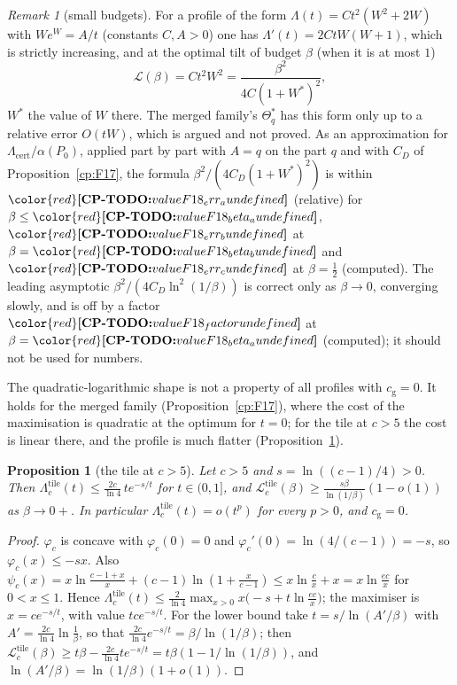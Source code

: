 \documentclass[11pt]{article}
\makeatletter
\newtheorem{proposition}[theorem]{Proposition}
\theoremstyle{definition}
\theoremstyle{remark}
\newtheorem{remark}[theorem]{Remark}
\DeclareRobustCommand{\CPTODO}[1]{{\color{red}\textbf{[CP-TODO:} #1\textbf{]}}}
\newcommand{\Lamcert}{\Lambda_{\mathrm{cert}}}%
\newcommand{\cg}{c_{\mathrm g}}               %
\newcommand{\Pzero}{P_0}                      %
\newcommand{\Leg}{\mathcal{L}}                        %
\newcommand{\LamT}[1]{\Lambda^{\mathrm{tile}}_{#1}}   %
\newcommand{\cpv}[1]{\ifcsname cpv@#1\endcsname\csname cpv@#1\endcsname\else\CPTODO{value #1 undefined}\fi}
\makeatother
\begin{document}
\begin{remark}[small budgets]\label{cp:F18}
For a profile of the form $\Lambda(t)=Ct^2(W^2+2W)$ with $We^W=A/t$ (constants $C,A>0$) one has $\Lambda'(t)=2CtW(W+1)$, which is strictly increasing, and at the optimal tilt of budget $\beta$ (when it is at most $1$)
\[
\Leg(\beta)=Ct^2W^2=\frac{\beta^2}{4C(1+W^*)^2},
\]
$W^*$ the value of $W$ there. The merged family's $\Theta^*_q$ has this form only up to a relative error $O(tW)$, which is argued and not proved. As an approximation for $\Lamcert/\alpha(\Pzero)$, applied part by part with $A=q$ on the part $q$ and with $C_D$ of Proposition~\ref{cp:F17}, the formula $\beta^2/(4C_D(1+W^*)^2)$ is within $\cpv{F18_err_a}$ (relative) for $\beta\le\cpv{F18_beta_a}$, $\cpv{F18_err_b}$ at $\beta=\cpv{F18_beta_b}$ and $\cpv{F18_err_c}$ at $\beta=\frac12$ (computed). The leading asymptotic $\beta^2/(4C_D\ln^2(1/\beta))$ is correct only as $\beta\to0$, converging slowly, and is off by a factor $\cpv{F18_factor}$ at $\beta=\cpv{F18_beta_a}$ (computed); it should not be used for numbers.
\end{remark}

The quadratic-logarithmic shape is not a property of all profiles with $\cg=0$. It holds for the merged family (Proposition~\ref{cp:F17}), where the cost of the maximisation is quadratic at the optimum for $t=0$; for the tile at $c>5$ the cost is linear there, and the profile is much flatter (Proposition~\ref{cp:F19}).

\begin{proposition}[the tile at $c>5$]\label{cp:F19}
Let $c>5$ and $s=\ln((c-1)/4)>0$. Then $\LamT c(t)\le\frac{2c}{\ln4}\,te^{-s/t}$ for $t\in(0,1]$, and $\Leg^{\mathrm{tile}}_c(\beta)\ge\frac{s\beta}{\ln(1/\beta)}(1-o(1))$ as $\beta\to0+$. In particular $\LamT c(t)=o(t^p)$ for every $p>0$, and $\cg=0$.
\end{proposition}

\begin{proof}
$\varphi_c$ is concave with $\varphi_c(0)=0$ and $\varphi_c'(0)=\ln(4/(c-1))=-s$, so $\varphi_c(x)\le-sx$. Also $\psi_c(x)=x\ln\frac{c-1+x}x+(c-1)\ln(1+\frac x{c-1})\le x\ln\frac cx+x=x\ln\frac{ec}x$ for $0<x\le1$. Hence $\LamT c(t)\le\frac2{\ln4}\max_{x>0}x\bigl(-s+t\ln\frac{ec}x\bigr)$; the maximiser is $x=ce^{-s/t}$, with value $tce^{-s/t}$. For the lower bound take $t=s/\ln(A'/\beta)$ with $A'=\frac{2c}{\ln4}\ln\frac1\beta$, so that $\frac{2c}{\ln4}e^{-s/t}=\beta/\ln(1/\beta)$; then $\Leg^{\mathrm{tile}}_c(\beta)\ge t\beta-\frac{2c}{\ln4}te^{-s/t}=t\beta(1-1/\ln(1/\beta))$, and $\ln(A'/\beta)=\ln(1/\beta)(1+o(1))$.
\end{proof}
\end{document}
